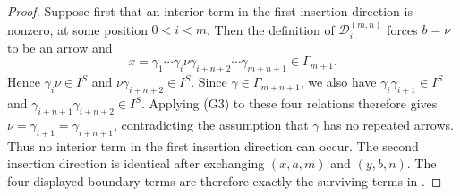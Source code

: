 \documentclass[11pt,a4paper,reqno]{amsart}
\newcommand{\mD}{\mathcal D}
\theoremstyle{plain}
\theoremstyle{definition}
\numberwithin{equation}{section}
\begin{document}
	\begin{proof}
		Suppose first that an interior term in the first insertion direction is
		nonzero, at some position $0<i<m$.  Then the definition of
		$\mD_i^{(m,n)}$ forces $b=\nu$ to be an arrow and
		\[
		x=\gamma_1\cdots\gamma_i\nu
		\gamma_{i+n+2}\cdots\gamma_{m+n+1}\in\Gamma_{m+1}.
		\]
		Hence
		$\gamma_i\nu\in I^S$ and $\nu\gamma_{i+n+2}\in I^S$.
		Since $\gamma\in\Gamma_{m+n+1}$, we also have
		$\gamma_i\gamma_{i+1}\in I^S$ and $\gamma_{i+n+1}\gamma_{i+n+2}\in I^S$.
		Applying \textup{(G3)} to these four relations therefore gives
		$\nu=\gamma_{i+1}=\gamma_{i+n+1}$,
		contradicting the assumption that $\gamma$ has no repeated arrows.  Thus no
		interior term in the first insertion direction can occur.  The second
		insertion direction is identical after exchanging $(x,a,m)$ and $(y,b,n)$.
		The four displayed boundary terms are therefore exactly the surviving terms
		in .
	\end{proof}
\end{document}
